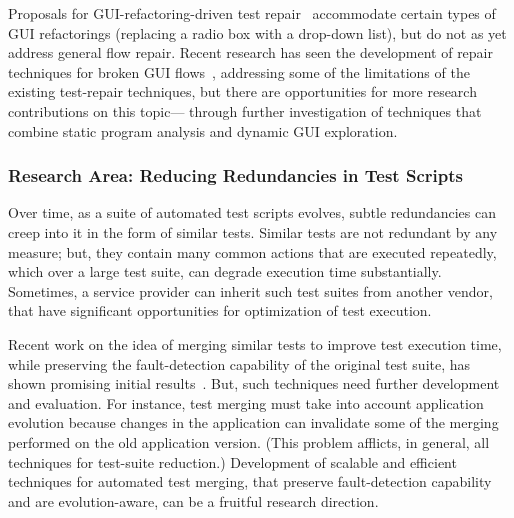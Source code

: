 
Proposals for GUI-refactoring-driven test repair~\cite{Daniel2011} accommodate
certain types of GUI refactorings (\eg replacing a radio box with a drop-down
list), but do not as yet address general flow repair.  Recent research has seen
the development of repair techniques for broken GUI flows~\cite{Zhang2013},
addressing some of the limitations of the existing test-repair techniques, but
there are opportunities for more research contributions on this topic---\eg
through further investigation of techniques that combine static program analysis
and dynamic GUI exploration.

\subsubsection*{Research Area: Reducing Redundancies in Test Scripts}

Over time, as a suite of automated test scripts evolves, subtle redundancies can
creep into it in the form of similar tests. Similar tests are not redundant by
any measure; but, they contain many common actions that are executed repeatedly,
which over a large test suite, can degrade execution time substantially.
Sometimes, a service provider can inherit such test suites from another vendor,
that have significant opportunities for optimization of test execution.

Recent work on the idea of merging similar tests to improve test execution time,
while preserving the fault-detection capability of the original test suite, has
shown promising initial results~\cite{Devaki:2013}. But, such techniques need
further development and evaluation. For instance, test merging must take into
account application evolution because changes in the application can invalidate
some of the merging performed on the old application version. (This problem
afflicts, in general, all techniques for test-suite reduction.)  Development of
scalable and efficient techniques for automated test merging, that preserve
fault-detection capability and are evolution-aware, can be a fruitful research
direction.

